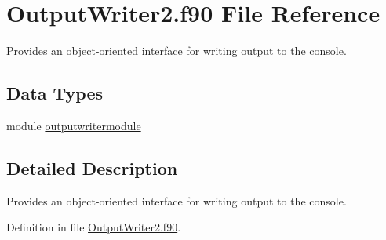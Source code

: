 \hypertarget{OutputWriter2_8f90}{\section{Output\+Writer2.\+f90 File Reference}
\label{OutputWriter2_8f90}
}


Provides an object-\/oriented interface for writing output to the console.  


\subsection*{Data Types}
\begin{DoxyCompactItemize}
\item 
module \hyperlink{classoutputwritermodule}{outputwritermodule}
\end{DoxyCompactItemize}


\subsection{Detailed Description}
Provides an object-\/oriented interface for writing output to the console. 



Definition in file \hyperlink{OutputWriter2_8f90_source}{Output\+Writer2.\+f90}.


